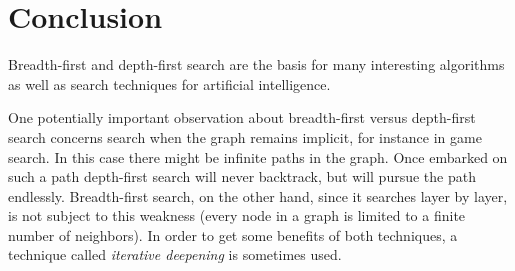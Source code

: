 \section{Conclusion}
\label{sec:graphsearch:conclusion}

Breadth-first and depth-first search are the basis for many
interesting algorithms as well as search techniques for artificial
intelligence.

One potentially important observation about breadth-first versus
depth-first search concerns search when the graph remains implicit,
for instance in game search. In this case there might be infinite
paths in the graph.  Once embarked on such a path depth-first search
will never backtrack, but will pursue the path
endlessly. Breadth-first search, on the other hand, since it searches
layer by layer, is not subject to this weakness (every node in a graph
is limited to a finite number of neighbors). In order to get some
benefits of both techniques, a technique called \emph{iterative
  deepening} is sometimes used.



% 
% 
